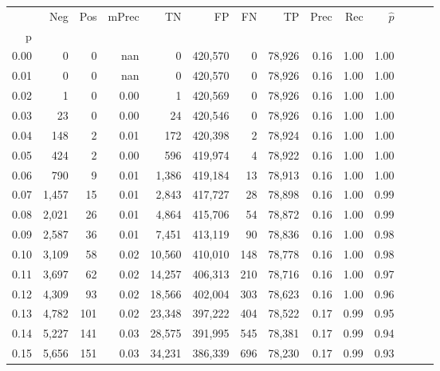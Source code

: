 \begin{tabular}{rrrrrrrrrrrrrr}
\toprule
{} &    Neg &    Pos & mPrec &       TN &       FP &      FN &      TP &  Prec &   Rec & $\hat{p}$ \\
p    &        &        &       &          &          &         &         &       &       &           \\
\midrule
0.00 &      0 &      0 &   nan &        0 &  420,570 &       0 &  78,926 &  0.16 &  1.00 &      1.00 \\
0.01 &      0 &      0 &   nan &        0 &  420,570 &       0 &  78,926 &  0.16 &  1.00 &      1.00 \\
0.02 &      1 &      0 &  0.00 &        1 &  420,569 &       0 &  78,926 &  0.16 &  1.00 &      1.00 \\
0.03 &     23 &      0 &  0.00 &       24 &  420,546 &       0 &  78,926 &  0.16 &  1.00 &      1.00 \\
0.04 &    148 &      2 &  0.01 &      172 &  420,398 &       2 &  78,924 &  0.16 &  1.00 &      1.00 \\
0.05 &    424 &      2 &  0.00 &      596 &  419,974 &       4 &  78,922 &  0.16 &  1.00 &      1.00 \\
0.06 &    790 &      9 &  0.01 &    1,386 &  419,184 &      13 &  78,913 &  0.16 &  1.00 &      1.00 \\
0.07 &  1,457 &     15 &  0.01 &    2,843 &  417,727 &      28 &  78,898 &  0.16 &  1.00 &      0.99 \\
0.08 &  2,021 &     26 &  0.01 &    4,864 &  415,706 &      54 &  78,872 &  0.16 &  1.00 &      0.99 \\
0.09 &  2,587 &     36 &  0.01 &    7,451 &  413,119 &      90 &  78,836 &  0.16 &  1.00 &      0.98 \\
0.10 &  3,109 &     58 &  0.02 &   10,560 &  410,010 &     148 &  78,778 &  0.16 &  1.00 &      0.98 \\
0.11 &  3,697 &     62 &  0.02 &   14,257 &  406,313 &     210 &  78,716 &  0.16 &  1.00 &      0.97 \\
0.12 &  4,309 &     93 &  0.02 &   18,566 &  402,004 &     303 &  78,623 &  0.16 &  1.00 &      0.96 \\
0.13 &  4,782 &    101 &  0.02 &   23,348 &  397,222 &     404 &  78,522 &  0.17 &  0.99 &      0.95 \\
0.14 &  5,227 &    141 &  0.03 &   28,575 &  391,995 &     545 &  78,381 &  0.17 &  0.99 &      0.94 \\
0.15 &  5,656 &    151 &  0.03 &   34,231 &  386,339 &     696 &  78,230 &  0.17 &  0.99 &      0.93 \\

\end{tabular}
